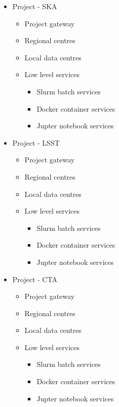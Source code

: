 \documentclass[11pt,a4paper]{ivoa}
\begin{document}
\begin{itemize}
    \item Project - SKA
    \begin{itemize}
        \item Project gateway
        \item Regional centres
        \item Local data centres
        \item Low level services
        \begin{itemize}
            \item Slurm batch services
            \item Docker container services
            \item Jupter notebook services
        \end{itemize}
    \end{itemize}
\end{itemize}

\begin{itemize}
    \item Project - LSST
    \begin{itemize}
        \item Project gateway
        \item Regional centres
        \item Local data centres
        \item Low level services
        \begin{itemize}
            \item Slurm batch services
            \item Docker container services
            \item Jupter notebook services
        \end{itemize}
    \end{itemize}
\end{itemize}

\begin{itemize}
    \item Project - CTA
    \begin{itemize}
        \item Project gateway
        \item Regional centres
        \item Local data centres
        \item Low level services
        \begin{itemize}
            \item Slurm batch services
            \item Docker container services
            \item Jupter notebook services
        \end{itemize}
    \end{itemize}
\end{itemize}
\end{document}

